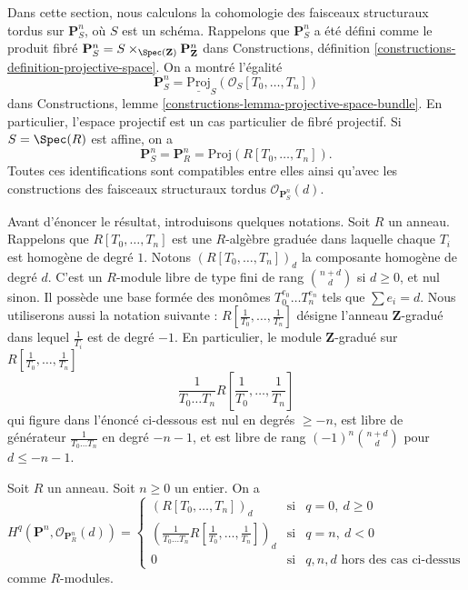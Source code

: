 \noindent
Dans cette section, nous calculons la cohomologie des faisceaux structuraux
tordus sur $\mathbf{P}^n_S$, où $S$ est un
schéma. Rappelons que $\mathbf{P}^n_S$ a été défini comme le produit fibré
$
\mathbf{P}^n_S = S \times_{\Spec(\mathbf{Z})} \mathbf{P}^n_{\mathbf{Z}}
$
dans Constructions, définition \ref{constructions-definition-projective-space}.
On a montré l'égalité
$$
\mathbf{P}^n_S = \underline{\text{Proj}}_S(\mathcal{O}_S[T_0, \ldots, T_n])
$$
dans Constructions, lemme \ref{constructions-lemma-projective-space-bundle}.
En particulier, l'espace projectif est un cas particulier de fibré projectif.
Si $S = \Spec(R)$ est affine, on a
$$
\mathbf{P}^n_S = \mathbf{P}^n_R = \text{Proj}(R[T_0, \ldots, T_n]).
$$
Toutes ces identifications sont compatibles entre elles ainsi qu'avec les
constructions des faisceaux structuraux tordus $\mathcal{O}_{\mathbf{P}^n_S}(d)$.

\medskip\noindent
Avant d'énoncer le résultat, introduisons quelques notations.
Soit $R$ un anneau.
Rappelons que $R[T_0, \ldots, T_n]$ est une
$R$-algèbre graduée dans laquelle chaque $T_i$ est homogène de degré $1$.
Notons $(R[T_0, \ldots, T_n])_d$ la composante homogène de degré $d$.
C'est un $R$-module libre de type fini de rang $\binom{n + d}{d}$
si $d \geq 0$, et nul
sinon. Il possède une base formée des monômes $T_0^{e_0} \ldots T_n^{e_n}$
tels que $\sum e_i = d$. Nous utiliserons aussi la notation suivante :
$R[\frac{1}{T_0}, \ldots, \frac{1}{T_n}]$ désigne l'anneau $\mathbf{Z}$-gradué
dans lequel $\frac{1}{T_i}$ est de degré $-1$. En particulier, le module
$\mathbf{Z}$-gradué sur $R[\frac{1}{T_0}, \ldots, \frac{1}{T_n}]$
$$
\frac{1}{T_0 \ldots T_n} R[\frac{1}{T_0}, \ldots, \frac{1}{T_n}]
$$
qui figure dans l'énoncé ci-dessous est nul en degrés
$\geq -n$, est libre de générateur $\frac{1}{T_0 \ldots T_n}$
en degré $-n - 1$, et est libre de rang $(-1)^n\binom{n + d}{d}$ pour
$d \leq -n - 1$.

\begin{lemma}
\label{lemma-cohomology-projective-space-over-ring}
\begin{reference}
\cite[III Proposition 2.1.12]{EGA}
\end{reference}
Soit $R$ un anneau.
Soit $n \geq 0$ un entier.
On a
$$
H^q(\mathbf{P}^n, \mathcal{O}_{\mathbf{P}^n_R}(d)) =
\left\{
\begin{matrix}
(R[T_0, \ldots, T_n])_d & \text{si} & q = 0,\ d \geq 0 \\
\left(\frac{1}{T_0 \ldots T_n} R[\frac{1}{T_0}, \ldots, \frac{1}{T_n}]\right)_d
& \text{si} & q = n,\ d < 0 \\
0 & \text{si} & q, n, d\text{ hors des cas ci-dessus}
\end{matrix}
\right.
$$
comme $R$-modules.
\end{lemma}

